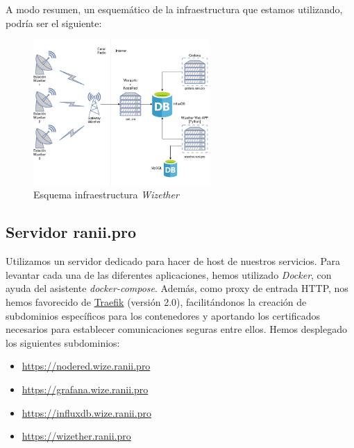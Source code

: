 \documentclass[12pt]{article}
\begin{document}
\noindent A modo resumen, un esquemático de la infraestructura que estamos utilizando, podría ser el siguiente:

\begin{figure}[h]
	\begin{center}
		\includegraphics[width=0.6\textwidth]{img_rani/WizeTher_infraestructura.png}
		\caption{Esquema infraestructura \textit{Wizether}}
	\end{center}
\end{figure}

\pagebreak

\subsection{Servidor ranii.pro}
\noindent Utilizamos un servidor dedicado para hacer de host de nuestros servicios. Para levantar cada una de las diferentes aplicaciones, hemos utilizado \textit{Docker}, con ayuda del asistente \textit{docker-compose}. Además, como proxy de entrada HTTP, nos hemos favorecido de \href{https://traefik.io/}{Traefik} (versión 2.0), facilitándonos la creación de subdominios específicos para los contenedores y aportando los certificados necesarios para establecer comunicaciones seguras entre ellos. Hemos desplegado los siguientes subdominios:
\begin{itemize}
	\item \href{https://nodered.wize.ranii.pro}{https://nodered.wize.ranii.pro} 
	
	\item \href{https://grafana.wize.ranii.pro}{https://grafana.wize.ranii.pro} 
	
	\item \href{https://influxdb.wize.ranii.pro}{https://influxdb.wize.ranii.pro} 
	
	\item \href{https://wizether.ranii.pro}{https://wizether.ranii.pro} 
	
\end{itemize}
\end{document}
